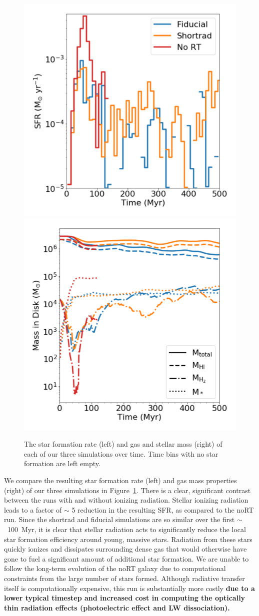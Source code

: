 \documentclass[twocolumn]{aastex62}
\begin{document}
\begin{figure}
\centering
\includegraphics[width=0.49\linewidth]{sfr}
\includegraphics[width=0.49\linewidth]{mass}
\caption{The star formation rate (left) and gas and stellar mass (right) of each of our three simulations over time. Time bins with no star formation are left empty.}
\label{fig:sfr_mass_evolution}
\end{figure}

We compare the resulting star formation rate (left) and gas mass properties (right) of our three simulations in Figure~\ref{fig:sfr_mass_evolution}. There is a clear, significant contrast between the runs with and without ionizing radiation. Stellar ionizing radiation leads to a factor of $\sim$ 5 reduction in the resulting SFR, as compared to the noRT run. Since the shortrad and fiducial simulations are so similar over the first $\sim$~100~Myr, it is clear that stellar radiation acts to significantly reduce the local star formation efficiency around young, massive stars. Radiation from these stars quickly ionizes and dissipates surrounding dense gas that would otherwise have gone to fuel a significant amount of additional star formation. We are unable to follow the long-term evolution of the noRT galaxy due to computational constraints from the large number of stars formed. Although radiative transfer itself is computationally expensive, this run is substantially more costly \textbf{due to a lower typical timestep and increased cost in computing the optically thin radiation effects (photoelectric effect and LW dissociation).}
\end{document}
